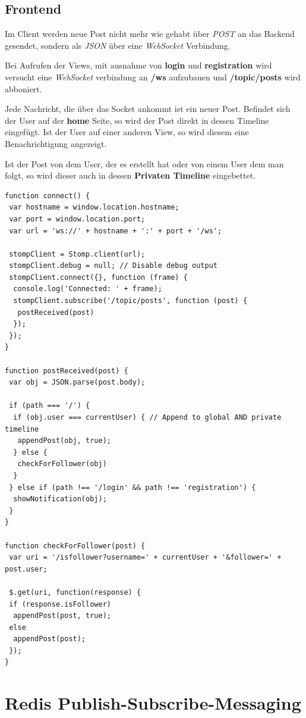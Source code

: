 \documentclass[
    a4paper
]{scrreprt}
\begin{document}
	\subsection{Frontend}
	Im Client werden neue Post nicht mehr wie gehabt über \textit{POST} an das Backend gesendet, sondern als \textit{JSON} über eine \textit{WebSocket} Verbindung.
	
	Bei Aufrufen der Views, mit ausnahme von \textbf{login} und \textbf{registration} wird versucht eine \textit{WebSocket} verbindung an \textbf{/ws} aufzubauen und \textbf{/topic/posts} wird abboniert. 
	
	Jede Nachricht, die über das Socket ankommt ist ein neuer Post. 
	Befindet sich der User auf der \textbf{home} Seite, so wird der Post direkt in dessen Timeline eingefügt. Ist der User auf einer anderen View, so wird diesem eine Benachrichtigung angezeigt.
	
	Ist der Post von dem User, der es erstellt hat oder von einem User dem man folgt, so wird dieser auch in dessen \textbf{Privaten Timeline} eingebettet. 
	
	\begin{lstlisting}
function connect() {
 var hostname = window.location.hostname; 
 var port = window.location.port;
 var url = 'ws://' + hostname + ':' + port + '/ws';

 stompClient = Stomp.client(url);
 stompClient.debug = null; // Disable debug output
 stompClient.connect({}, function (frame) {
  console.log('Connected: ' + frame);
  stompClient.subscribe('/topic/posts', function (post) {
   postReceived(post)
  });
 });
}

function postReceived(post) {
 var obj = JSON.parse(post.body);

 if (path === '/') {
  if (obj.user === currentUser) { // Append to global AND private timeline
   appendPost(obj, true);
  } else {
   checkForFollower(obj)
  }
 } else if (path !== '/login' && path !== 'registration') {
  showNotification(obj);
 }
}

function checkForFollower(post) {
 var uri = '/isfollower?username=' + currentUser + '&follower=' + post.user;

 $.get(uri, function(response) {
 if (response.isFollower)
  appendPost(post, true);
 else
  appendPost(post);
 });
}
	\end{lstlisting}
 	
	\section{Redis Publish-Subscribe-Messaging}
	
\end{document}
